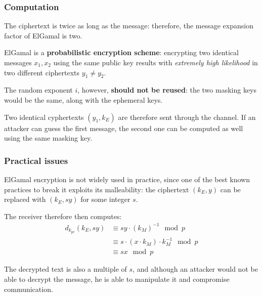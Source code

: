\documentclass{beamer}
\begin{document}

\begin{frame}
\frametitle{Computation}

The ciphertext is twice as long as the message: therefore, the message expansion factor of ElGamal is two. 

ElGamal  is a \textbf{probabilistic encryption scheme}: encrypting two identical messages $x_1, x_2$ using the same public key results with \textit{extremely high likelihood} in two different ciphertexts $y_1 \neq y_2$. 

The random exponent $i$, however, \textbf{should not be reused}: the two masking keys would be the same, along with the ephemeral keys.

Two identical cyphertexts $(y_1, k_E)$ are therefore sent through the channel. If an attacker can guess the first message, the second one can be computed as well using the same masking key.

\end{frame}


\begin{frame}
\frametitle{Practical issues}
ElGamal encryption is not widely used in practice, since one of the best known practices to break it exploits its malleability: the ciphertext $(k_E, y)$ can be replaced with $(k_E, sy)$ for some integer $s$.

The receiver therefore then computes:
\begin{equation}
\begin{split}
d_{k_{pr}}(k_E, sy) &\equiv sy \cdot (k_M)^{-1} \mod p \\
&\equiv s \cdot (x \cdot k_M) \cdot k_M^{-1} \mod p \\
&\equiv sx \mod p
\end{split}
\end{equation}

The decrypted text is also a multiple of $s$, and although an attacker would not be able to decrypt the message, he is able to manipulate it and compromise communication.

\end{frame}

\end{document}
